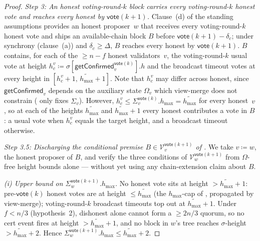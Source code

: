 \ifx\litemode\undefined\documentclass{article}\fi
\newcommand{\V}[0]{\ensuremath{\mathcal{V}}}
\newcommand{\hmax}{\ensuremath{h_{\max}}\xspace}
\newcommand{\vote}{\ensuremath{\mathsf{vote}}}
\newcommand{\comm}[1]{\ensuremath{\widetilde{#1}}}
\newcommand{\getConfirmed}{\textsf{getConfirmed}\xspace}
\theoremstyle{plain}
\theoremstyle{definition}
\theoremstyle{remark}
\begin{document}
\begin{proof}
\emph{Step 3: An honest voting-round-$k$ block carries every voting-round-$k$ honest vote and reaches every honest by $\vote(k+1)$.}
Clause~(d) of the standing assumptions provides an honest proposer~$w$ that receives every voting-round-$k$ honest vote and ships an available-chain block $B$ before $\vote(k+1) - \delta_c$; under synchrony (clause~(a)) and $\delta_c \geq \Delta$, $B$ reaches every honest by $\vote(k+1)$. $B$ contains, for each of the $\geq n - f$ honest validators~$v$, the voting-round-$k$ usual vote at height $h_c^v \coloneqq \sigma[\getConfirmed_v^{\vote(k)}].h$ and the broadcast timeout votes at every height in $[h_c^v+1,\, \comm{\hmax}+1]$. Note that $h_c^v$ may differ across honest, since $\getConfirmed_v$ depends on the auxiliary state $\Omega_v$ which view-merge does not constrain ( only fixes $\Sigma_v$). However, $h_c^v \leq \Sigma_v^{\vote(k)}.\hmax = \comm{\hmax}$ for every honest~$v$, so at each of the heights $\comm{\hmax}$ and $\comm{\hmax}+1$ every honest contributes a vote in $B$: a usual vote when $h_c^v$ equals the target height, and a broadcast timeout otherwise.

\emph{Step 3.5: Discharging the conditional premise $B \in \V_v^{\vote(k+1)}$ of .}
We take $v \coloneqq w$, the honest proposer of $B$, and verify the three conditions of $\V_w^{\vote(k+1)}$ from $\Omega$-free height bounds alone — without yet using any chain-extension claim about $B$.

\emph{(i) Upper bound on $\Sigma_w^{\vote(k+1)}.\hmax$.}
No honest vote sits at height $> \comm{\hmax}+1$: pre-$\vote(k)$ honest votes are at height $\leq \comm{\hmax}$ (the $\hmax$-cap of , propagated by view-merge); voting-round-$k$ broadcast timeouts top out at $\comm{\hmax}+1$. Under $f < n/3$ (hypothesis~2), dishonest alone cannot form a $\geq 2n/3$ quorum, so no cert event fires at height $> \comm{\hmax}+1$, and no block in $w$'s tree reaches $\sigma$-height $> \comm{\hmax}+2$. Hence $\Sigma_w^{\vote(k+1)}.\hmax \leq \comm{\hmax}+2$.


\end{proof}
\end{document}
